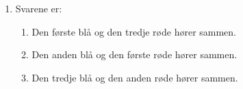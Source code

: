 \begin{enumerate}
	
	\item \label{it:diff11} Svarene er:
		\begin{enumerate}
		\item Den første blå og den tredje røde hører sammen.
		\item Den anden blå og den første røde hører sammen.
		\item Den tredje blå og den anden røde hører sammen.
	\end{enumerate}
%		
%

\end{enumerate}
